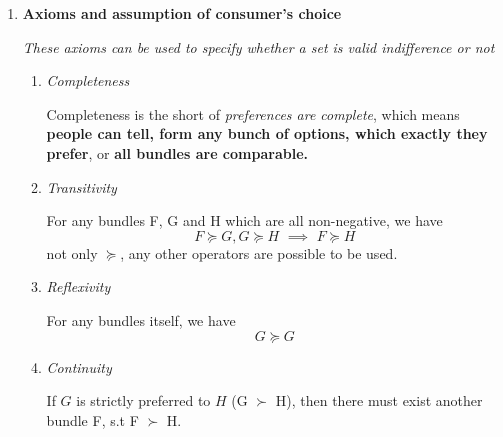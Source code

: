 \documentclass[10pt]{article}
\newenvironment{changemargin}[2]{%
  \begin{list}{}{%
    \setlength{\topsep}{0pt}%
    \setlength{\leftmargin}{#1}%
    \setlength{\rightmargin}{#2}%
    \setlength{\listparindent}{\parindent}%
    \setlength{\itemindent}{\parindent}%
    \setlength{\parsep}{\parskip}%
  }%
  \item[]}{\end{list}}
\begin{document}
\begin{changemargin}{-0.125in}{0in}
\begin{enumerate}
\begin{enumerate}
         \medskip
         
         \item
         
         \textbf{Axioms and assumption of consumer's choice}
         
         \smallskip
         
          \textit{These axioms can be used to specify whether a set is valid indifference or not}
          
          \begin{enumerate}
          
            \item \textit{Completeness}
               
               \smallskip
               
               Completeness is the short of \textit{preferences are complete}, which means \textbf{people can tell, form any bunch of options, which exactly they prefer}, or \textbf{all bundles are comparable.}
               
            \smallskip
            
            
            \item \textit{Transitivity}
            
            \smallskip
            
            For any bundles F, G and H which are all non-negative, we have
                \[
                F \succeq G, G \succeq H\,\, \implies \,\, F \succeq H
                \] 
                not only $\succeq$, any other operators are possible to be used.
                
                \smallskip
                
            \item \textit{Reflexivity}
                
                \smallskip
                
                For any bundles itself, we have                 
                \[
                 G \succeq G
                \]
                
                \smallskip
                         
                \item \textit{Continuity}
                
                \smallskip
                
                If $G$ is strictly preferred to $H$ (G $\succ$ H), then there must exist another bundle F, s.t F $\succ$ H.
                

\end{enumerate}
\end{enumerate}
\end{enumerate}
\end{changemargin}
\end{document}
